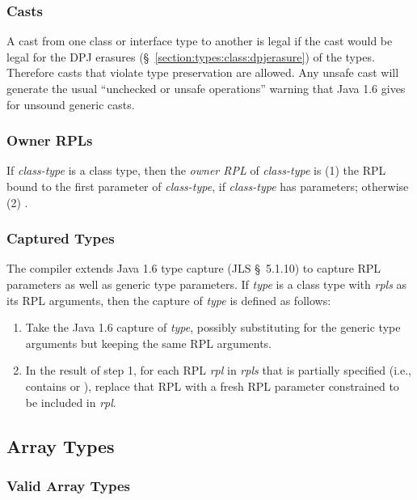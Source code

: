 \subsubsection{Casts}
\label{section:types:class:casts}

A cast from one class or interface type to another is legal if the
cast would be legal for the DPJ erasures
(\S~\ref{section:types:class:dpjerasure}) of the types.  Therefore
casts that violate type preservation are allowed.  Any unsafe cast
will generate the usual ``unchecked or unsafe operations'' warning
that Java 1.6 gives for unsound generic casts.

\subsubsection{Owner RPLs}
\label{section:types:class:owner-rpls}

If \emph{class-type} is a class type, then the \emph{owner RPL} of
\emph{class-type} is (1) the RPL bound to the first parameter of
\emph{class-type}, if \emph{class-type} has parameters; otherwise (2)
.

\subsubsection{Captured Types}
\label{section:types:class:capture}

The compiler extends Java 1.6 type capture (JLS \S~5.1.10) to capture
RPL parameters as well as generic type parameters.  If \emph{type} is
a class type with \emph{rpls} as its RPL arguments, then the capture
of \emph{type} is defined as follows:
\begin{enumerate}
\item Take the Java 1.6 capture of \emph{type}, possibly
  substituting for the generic type arguments but keeping the same RPL
  arguments.
\item In the result of step 1, for each RPL \emph{rpl} in \emph{rpls}
  that is partially specified (i.e., contains \kwd{*} or \kwd{[?]}),
  replace that RPL with a fresh RPL parameter constrained to be
  included in \emph{rpl}.
\end{enumerate}


\subsection{Array Types}

\subsubsection{Valid Array Types}
\label{arrays:valid}

